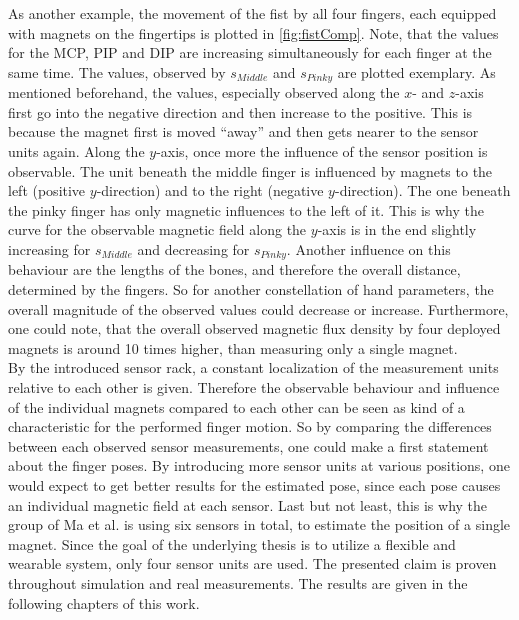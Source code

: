 As another example, the movement of the fist by all four fingers, each equipped with magnets on the fingertips is plotted in \ref{fig:fistComp}. Note, that the values for the \ac{MCP}, \ac{PIP} and \ac{DIP} are increasing simultaneously for each finger at the same time. The values, observed by $ s_{Middle} $ and $ s_{Pinky} $ are plotted exemplary. As mentioned beforehand, the values, especially observed along the $ x $- and $ z $-axis first go into the negative direction and then increase to the positive. This is because the magnet first is moved ``away'' and then gets nearer to the sensor units again. Along the $ y $-axis, once more the influence of the sensor position is observable. The unit beneath the middle finger is influenced by magnets to the left (positive $ y $-direction) and to the right (negative $ y $-direction). The one beneath the pinky finger has only magnetic influences to the left of it. This is why the curve for the observable magnetic field along the $ y $-axis is in the end slightly increasing for $ s_{Middle} $ and decreasing for $ s_{Pinky} $. Another influence on this behaviour are the lengths of the bones, and therefore the overall distance, determined by the fingers. So for another constellation of hand parameters, the overall magnitude of the observed values could decrease or increase. Furthermore, one could note, that the overall observed magnetic flux density by four deployed magnets is around 10 times higher, than measuring only a single magnet.\\
By the introduced sensor rack, a constant localization of the measurement units relative to each other is given. Therefore the observable behaviour and influence of the individual magnets compared to each other can be seen as kind of a characteristic for the performed finger motion. So by comparing the differences between each observed sensor measurements, one could make a first statement about the finger poses. By introducing more sensor units at various positions, one would expect to get better results for the estimated pose, since each pose causes an individual magnetic field at each sensor. Last but not least, this is why the group of Ma et al. is using six sensors in total, to estimate the position of a single magnet. Since the goal of the underlying thesis is to utilize a flexible and wearable system, only four sensor units are used. The presented claim is proven throughout simulation and real measurements. The results are given in the following chapters of this work.

\FloatBarrier



